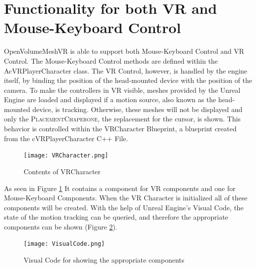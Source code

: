\documentclass{report}
\begin{document}
	\section{Functionality for both VR and Mouse-Keyboard Control}
	\startsection
		OpenVolumeMeshVR is able to support both Mouse-Keyboard Control and VR Control. The Mouse-Keyboard Control methods are defined within the AcVRPlayerCharacter class. The VR Control, however, is handled by the engine itself, by binding the position of the head-mounted device with the position of the camera. To make the controllers in VR visible, meshes provided by the Unreal Engine are loaded and displayed if a motion source, also known as the head-mounted device, is tracking. Otherwise, these meshes will not be displayed and only the \textsc{PlacementChaperone}, the replacement for the cursor, is shown. This behavior is controlled within the VRCharacter Blueprint, a blueprint created from the cVRPlayerCharacter C++ File.
		\begin{figure}[H]
			\begin{center}
				\texttt{[image: VRCharacter.png]} 
				\caption{Contents of VRCharacter}
				\label{VRCharacterContent}
			\end{center}
		\end{figure}
		\noindent As seen in Figure \ref{VRCharacterContent} It contains a component for VR components and one for Mouse-Keyboard Components. When the VR Character is initialized all of these components will be created. With the help of Unreal Engine's Visual Code, the state of the motion tracking can be queried, and therefore the appropriate components can be shown (Figure \ref{VisualCode}).
		\begin{figure}[H]
			\begin{center}
				\texttt{[image: VisualCode.png]} 
				\caption{Visual Code for showing the appropriate components}
				\label{VisualCode}
			\end{center}
		\end{figure}
	\closesection
	
\end{document}

